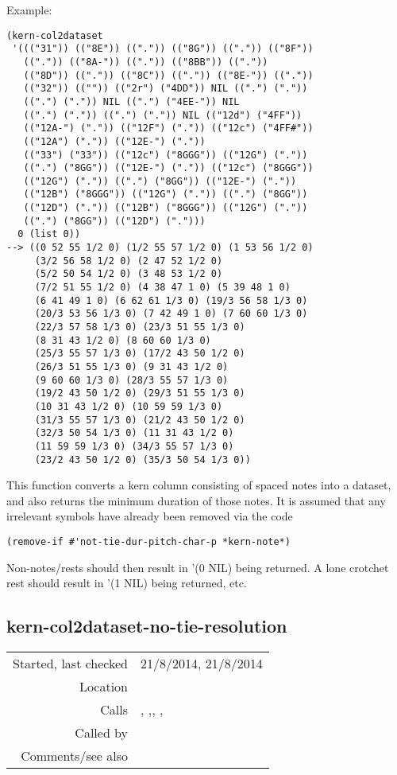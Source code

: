 \vspace{0.5cm}
\noindent Example:
\begin{verbatim}
(kern-col2dataset
 '((("31")) (("8E")) ((".")) (("8G")) ((".")) (("8F"))
   ((".")) (("8A-")) ((".")) (("8BB")) (("."))
   (("8D")) ((".")) (("8C")) ((".")) (("8E-")) (("."))
   (("32")) (("")) (("2r") ("4DD")) NIL ((".") ("."))
   ((".") (".")) NIL ((".") ("4EE-")) NIL
   ((".") (".")) ((".") (".")) NIL (("12d") ("4FF"))
   (("12A-") (".")) (("12F") (".")) (("12c") ("4FF#"))
   (("12A") (".")) (("12E-") ("."))
   (("33") ("33")) (("12c") ("8GGG")) (("12G") ("."))
   ((".") ("8GG")) (("12E-") (".")) (("12c") ("8GGG"))
   (("12G") (".")) ((".") ("8GG")) (("12E-") ("."))
   (("12B") ("8GGG")) (("12G") (".")) ((".") ("8GG"))
   (("12D") (".")) (("12B") ("8GGG")) (("12G") ("."))
   ((".") ("8GG")) (("12D") (".")))
  0 (list 0))
--> ((0 52 55 1/2 0) (1/2 55 57 1/2 0) (1 53 56 1/2 0)
     (3/2 56 58 1/2 0) (2 47 52 1/2 0)
     (5/2 50 54 1/2 0) (3 48 53 1/2 0)
     (7/2 51 55 1/2 0) (4 38 47 1 0) (5 39 48 1 0)
     (6 41 49 1 0) (6 62 61 1/3 0) (19/3 56 58 1/3 0)
     (20/3 53 56 1/3 0) (7 42 49 1 0) (7 60 60 1/3 0)
     (22/3 57 58 1/3 0) (23/3 51 55 1/3 0)
     (8 31 43 1/2 0) (8 60 60 1/3 0)
     (25/3 55 57 1/3 0) (17/2 43 50 1/2 0)
     (26/3 51 55 1/3 0) (9 31 43 1/2 0)
     (9 60 60 1/3 0) (28/3 55 57 1/3 0)
     (19/2 43 50 1/2 0) (29/3 51 55 1/3 0)
     (10 31 43 1/2 0) (10 59 59 1/3 0)
     (31/3 55 57 1/3 0) (21/2 43 50 1/2 0)
     (32/3 50 54 1/3 0) (11 31 43 1/2 0)
     (11 59 59 1/3 0) (34/3 55 57 1/3 0)
     (23/2 43 50 1/2 0) (35/3 50 54 1/3 0))
\end{verbatim}

\noindent This function converts a kern column
consisting of spaced notes into a dataset, and also
returns the minimum duration of those notes. It is
assumed that any irrelevant symbols have already been
removed via the code
\begin{verbatim}
(remove-if #'not-tie-dur-pitch-char-p *kern-note*)
\end{verbatim}
Non-notes/rests should then result in '(0 NIL) being
returned. A lone crotchet rest should result in
'(1 NIL) being returned, etc.


\subsection*{kern-col2dataset-no-tie-resolution}\label{fun:kern-col2dataset-no-tie-resolution}

\vspace{0.3cm}
\begin{tabular}{r|p{8cm}}
Started, last checked & 21/8/2014, 21/8/2014 \\
Location & \nameref{sec:kern-by-col} \\
Calls & \nameref{fun:append-list}, \nameref{fun:constant-vector},\newline \nameref{fun:firstn}, \nameref{fun:parse-kern-spaced-notes}, \nameref{fun:sort-dataset-asc} \\
Called by & \nameref{fun:kern-anacrusis-correction} \\
Comments/see also &
\end{tabular}

